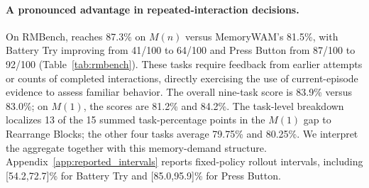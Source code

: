 \paragraph{A pronounced advantage in repeated-interaction decisions.}
On RMBench, \method{} reaches 87.3\% on $M(n)$ versus MemoryWAM's 81.5\%, with Battery Try improving from 41/100 to 64/100 and Press Button from 87/100 to 92/100 (Table~\ref{tab:rmbench}).
These tasks require feedback from earlier attempts or counts of completed interactions, directly exercising the use of current-episode evidence to assess familiar behavior.
The overall nine-task score is 83.9\% versus 83.0\%; on $M(1)$, the scores are 81.2\% and 84.2\%.
The task-level breakdown localizes 13 of the 15 summed task-percentage points in the $M(1)$ gap to Rearrange Blocks; the other four tasks average 79.75\% and 80.25\%.
We interpret the aggregate together with this memory-demand structure. Appendix~\ref{app:reported_intervals} reports fixed-policy rollout intervals, including [54.2,72.7]\% for Battery Try and [85.0,95.9]\% for Press Button.

